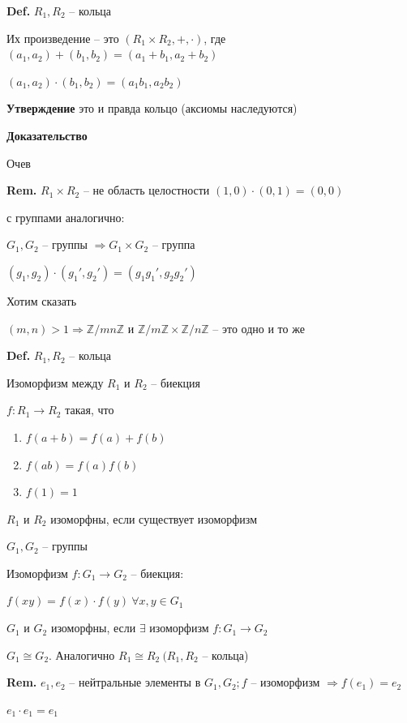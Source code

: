 \documentclass[14pt, letter paper]{article}
\begin{document}
\textbf{Def.} $R_1, R_2$ -- кольца

Их произведение -- это $(R_1 \times R_2, +, \cdot)$, где $(a_1,a_2) + (b_1,b_2) = (a_1 + b_1, a_2 + b_2)$

$(a_1, a_2) \cdot (b_1, b_2) = (a_1b_1, a_2b_2)$

\textbf{Утверждение} это и правда кольцо (аксиомы наследуются)

\begin{center}
    \textbf{Доказательство}
\end{center}

Очев

\textbf{Rem.} $R_1 \times R_2$ -- не область целостности $(1,0) \cdot (0, 1) = (0, 0)$

с группами аналогично:

$G_1, G_2$ -- группы $\Rightarrow G_1 \times G_2$ -- группа

$(g_1,g_2)\cdot(g_1',g_2') = (g_1g_1',g_2g_2')$

Хотим сказать

$(m,n) > 1 \Rightarrow \mathbb{Z}/mn\mathbb{Z}$ и $\mathbb{Z}/m\mathbb{Z} \times \mathbb{Z}/n\mathbb{Z}$ -- это одно и то же

\textbf{Def.} $R_1, R_2$ -- кольца

Изоморфизм между $R_1$ и $R_2$ -- биекция

$f:R_1 \rightarrow R_2$ такая, что

\begin{enumerate}
    \item $f(a + b) = f(a) + f(b)$
    \item $f(ab) = f(a)f(b)$
    \item $f(1)=1$
\end{enumerate}

$R_1$ и $R_2$ изоморфны, если существует изоморфизм

$G_1, G_2$ -- группы

Изоморфизм $f: G_1 \rightarrow G_2$ -- биекция:

$f(xy) = f(x) \cdot f(y)\ \forall x, y \in G_1$

$G_1$ и $G_2$ изоморфны, если $\exists$ изоморфизм $f : G_1 \rightarrow G_2$

$G_1 \cong G_2$. Аналогично $R_1 \cong R_2\ (R_1, R_2$ -- кольца)

\textbf{Rem.} $e_1, e_2$ -- нейтральные элементы в $G_1, G_2; f$ -- изоморфизм $\Rightarrow f(e_1) = e_2$

$e_1 \cdot e_1 = e_1$
\end{document}
